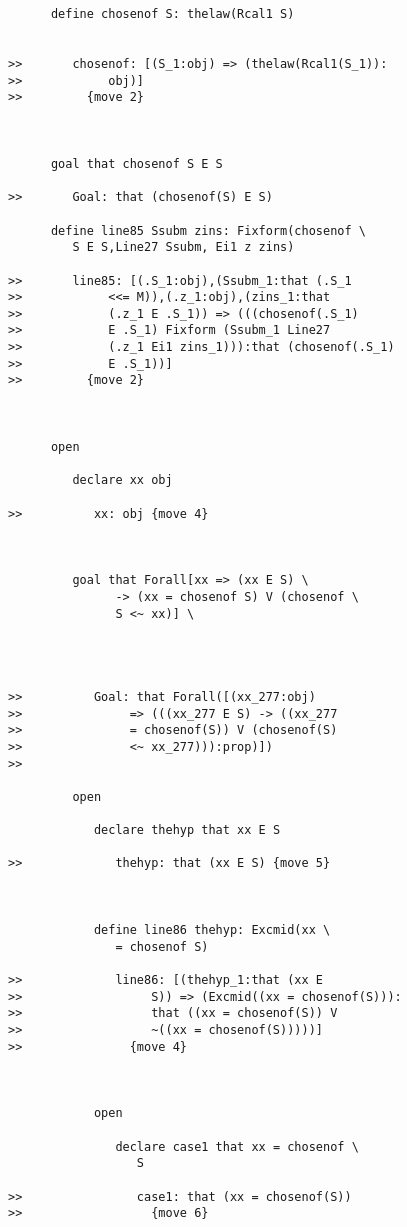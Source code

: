 \documentclass[12pt]{article}
\begin{document}
\begin{verbatim}
      define chosenof S: thelaw(Rcal1 S)


>>       chosenof: [(S_1:obj) => (thelaw(Rcal1(S_1)):
>>            obj)]
>>         {move 2}



      goal that chosenof S E S

>>       Goal: that (chosenof(S) E S)

      define line85 Ssubm zins: Fixform(chosenof \
         S E S,Line27 Ssubm, Ei1 z zins)

>>       line85: [(.S_1:obj),(Ssubm_1:that (.S_1
>>            <<= M)),(.z_1:obj),(zins_1:that
>>            (.z_1 E .S_1)) => (((chosenof(.S_1)
>>            E .S_1) Fixform (Ssubm_1 Line27
>>            (.z_1 Ei1 zins_1))):that (chosenof(.S_1)
>>            E .S_1))]
>>         {move 2}



      open

         declare xx obj

>>          xx: obj {move 4}



         goal that Forall[xx => (xx E S) \
               -> (xx = chosenof S) V (chosenof \
               S <~ xx)] \
            



>>          Goal: that Forall([(xx_277:obj)
>>               => (((xx_277 E S) -> ((xx_277
>>               = chosenof(S)) V (chosenof(S)
>>               <~ xx_277))):prop)])
>>            

         open

            declare thehyp that xx E S

>>             thehyp: that (xx E S) {move 5}



            define line86 thehyp: Excmid(xx \
               = chosenof S)

>>             line86: [(thehyp_1:that (xx E
>>                  S)) => (Excmid((xx = chosenof(S))):
>>                  that ((xx = chosenof(S)) V
>>                  ~((xx = chosenof(S)))))]
>>               {move 4}



            open

               declare case1 that xx = chosenof \
                  S

>>                case1: that (xx = chosenof(S))
>>                  {move 6}




\end{verbatim}
\end{document}
